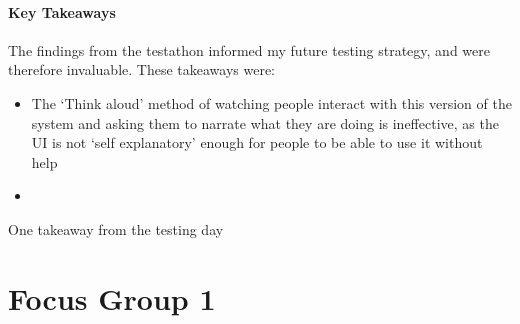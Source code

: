 \paragraph{Key Takeaways} The findings from the testathon informed my future testing strategy, and were therefore invaluable. These takeaways were:
\begin{itemize}
    \item The `Think aloud' method of watching people interact with this version of the system and asking them to narrate what they are doing is ineffective, as the UI is not `self explanatory' enough for people to be able to use it without help 
    \item 
\end{itemize}

One takeaway from the testing day 

\section{Focus Group 1}
